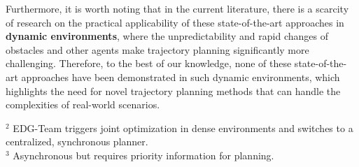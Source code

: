 Furthermore, it is worth noting that in the current literature, there is a scarcity of research on the practical applicability of these state-of-the-art approaches in \textbf{dynamic environments}, where the unpredictability and rapid changes of obstacles and other agents make trajectory planning significantly more challenging. Therefore, to the best of our knowledge, none of these state-of-the-art approaches have been demonstrated in such dynamic environments, which highlights the need for novel trajectory planning methods that can handle the complexities of real-world scenarios.

\begin{table}[h]
    \renewcommand{\arraystretch}{2.0}
    \scriptsize
    \begin{centering}
    \caption{\centering State-of-the-art Decentralized Multiagent Planners}
    \label{tab:state_of_the_art_comparison}
    \par\end{centering}
\vspace*{0.5em}
\footnotesize{$^2$ \!\!\! EDG-Team triggers joint optimization in dense environments and switches to a centralized, synchronous planner.} \\
\footnotesize{$^3$  \!\!\!\! Asynchronous but requires priority information for planning.}
\end{table}


